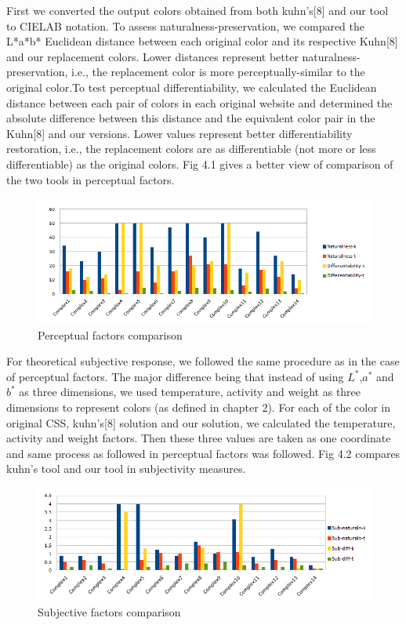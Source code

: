 First we converted the output colors obtained from both kuhn's[8] and our tool to CIELAB notation. To assess naturalness-preservation, we compared the L*a*b* Euclidean distance between each original color and its respective Kuhn[8] and our replacement colors. Lower distances represent better naturalness-preservation, i.e., the replacement color is more perceptually-similar to the original color.To test perceptual differentiability, we calculated the Euclidean distance between each pair of colors in each original website and determined the absolute difference between this distance and the equivalent color pair in the Kuhn[8] and our versions. Lower values represent better differentiability restoration, i.e., the replacement colors are as differentiable (not more or less differentiable) as the original colors. Fig 4.1 gives a better view of comparison of the two tools in perceptual factors. 

\begin{figure}[!htb]
\centering
\includegraphics[width=\linewidth]{bar1.png}
\caption{Perceptual factors comparison}
\label{fig:sub2}
\end{figure}

For theoretical subjective response, we followed the same procedure as in the case of perceptual factors. The major difference being that instead of using $L^{*}$,$a^{*}$ and $b^{*}$ as three dimensions, we used temperature, activity and weight as three dimensions to represent colors (as defined in chapter 2). For each of the color in original CSS, kuhn's[8] solution and our solution, we calculated the temperature, activity and weight factors. Then these three values are taken as one coordinate and same process as followed in  perceptual factors was followed. Fig 4.2 compares kuhn's tool and our tool in subjectivity measures. 

\begin{figure}[!htb]
\centering
\includegraphics[width=\linewidth]{bar2.png}
\caption{Subjective factors comparison}
\label{fig:sub2}
\end{figure}

